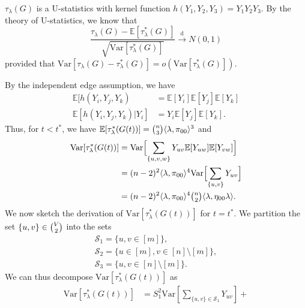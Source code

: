 \documentclass[10pt,journal,compsoc]{IEEEtran}
\theoremstyle{definition}
\begin{document}
\begin{IEEEproof}[Lemma~3]
  $\tau_{\lambda}(G)$ is a U-statistics with kernel function
  $h(Y_1, Y_2, Y_3) = Y_1 Y_2 Y_3$. By the theory of U-statistics, we
  know that
  \begin{equation}
    \label{eq:48}
    \frac{\tau_{\lambda}(G) -
      \mathbb{E}[\tau_{\lambda}^{*}(G)]}{\sqrt{\mathrm{Var}[\tau_{\lambda}^{*}(G)]}}
       \overset{\mathrm{d}}{\longrightarrow}  N(0,1)
  \end{equation}
  provided that $\mathrm{Var}[\tau_{\lambda}(G) -
  \tau_{\lambda}^{*}(G)] = o(\mathrm{Var}[\tau_{\lambda}^{*}(G)])$.
  
  By the independent edge assumption, we have
  \begin{align}
    \mathbb{E}[h(Y_i, Y_j, Y_k) &= \mathbb{E}[Y_i]
  \mathbb{E}[Y_j] \mathbb{E}[Y_k] \\ 
  \mathbb{E}[h(Y_i, Y_j, Y_k) |
  Y_i] &= Y_i \mathbb{E}[Y_j] \mathbb{E}[Y_k].
  \end{align}
 Thus, for $t < t^{*}$, we have $\mathbb{E}[\tau_{\lambda}^{*}(G(t))] = \tbinom{n}{3} \langle
  \lambda, \pi_{00} \rangle^{3}$ and
  \begin{equation}
    \begin{split}
      \mathrm{Var}[\tau_{\lambda}^{*}(G(t))] &=
      \mathrm{Var}\Bigl[\sum_{\{u,v,w\}} Y_{uv} \mathbb{E}[Y_{uw}]
      \mathbb{E}[Y_{vw}]\Bigr] \\
      &= (n-2)^{2} \langle \lambda, \pi_{00} \rangle^{4}
      \mathrm{Var}\Bigl[\sum_{\{u,v\}} Y_{uv} \Bigr] \\
      &= (n-2)^{2} \langle \lambda, \pi_{00} \rangle^{4} \tbinom{n}{2}
      \langle \lambda, \eta_{00} \lambda \rangle.
    \end{split}
  \end{equation}
  We now sketch the derivation of
  $\mathrm{Var}[\tau_{\lambda}^{*}(G(t))]$ for $t = t^{*}$. We partition the set
  $\{u,v\} \in \tbinom{V}{2}$ into the sets 
\begin{gather*}
\mathcal{S}_1 = \{ u,v \in [m]
  \}, \\ \mathcal{S}_2 = \{ u \in [m], v \in [n] \setminus [m]\}, \\
  \mathcal{S}_3 = \{ u, v \in [n] \setminus[m]\}.
\end{gather*} 
We can thus decompose $\mathrm{Var}[\tau_{\lambda}^{*}(G(t))]$ as 
\begin{equation}
  \begin{split}
  \mathrm{Var}[\tau_{\lambda}^{*}(G(t))] &= S_1^{2} \mathrm{Var}[\sum_{\{u,v\} \in \mathcal{S}_1} Y_{uv}] +

\end{split}
\end{equation}
\end{IEEEproof}
\end{document}
